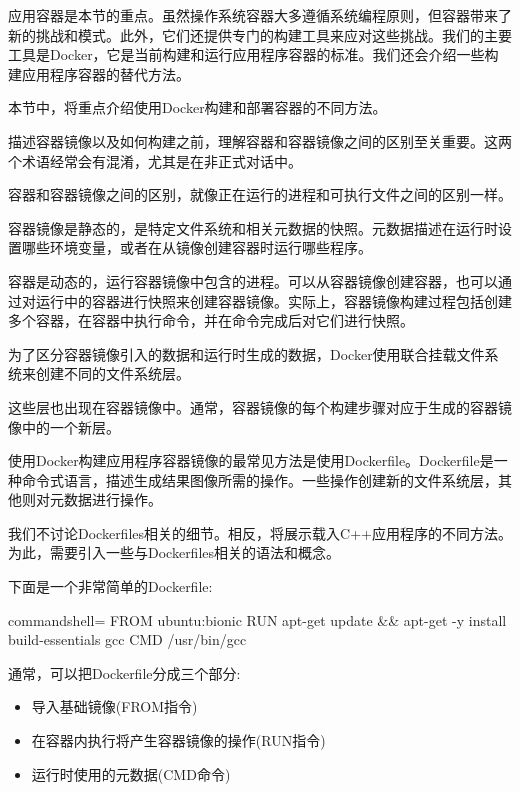 
应用容器是本节的重点。虽然操作系统容器大多遵循系统编程原则，但容器带来了新的挑战和模式。此外，它们还提供专门的构建工具来应对这些挑战。我们的主要工具是Docker，它是当前构建和运行应用程序容器的标准。我们还会介绍一些构建应用程序容器的替代方法。

本节中，将重点介绍使用Docker构建和部署容器的不同方法。


描述容器镜像以及如何构建之前，理解容器和容器镜像之间的区别至关重要。这两个术语经常会有混淆，尤其是在非正式对话中。

容器和容器镜像之间的区别，就像正在运行的进程和可执行文件之间的区别一样。

容器镜像是静态的，是特定文件系统和相关元数据的快照。元数据描述在运行时设置哪些环境变量，或者在从镜像创建容器时运行哪些程序。

容器是动态的，运行容器镜像中包含的进程。可以从容器镜像创建容器，也可以通过对运行中的容器进行快照来创建容器镜像。实际上，容器镜像构建过程包括创建多个容器，在容器中执行命令，并在命令完成后对它们进行快照。

为了区分容器镜像引入的数据和运行时生成的数据，Docker使用联合挂载文件系统来创建不同的文件系统层。

这些层也出现在容器镜像中。通常，容器镜像的每个构建步骤对应于生成的容器镜像中的一个新层。


使用Docker构建应用程序容器镜像的最常见方法是使用Dockerfile。Dockerfile是一种命令式语言，描述生成结果图像所需的操作。一些操作创建新的文件系统层，其他则对元数据进行操作。

我们不讨论Dockerfiles相关的细节。相反，将展示载入C++应用程序的不同方法。为此，需要引入一些与Dockerfiles相关的语法和概念。

下面是一个非常简单的Dockerfile:

\begin{tcblisting}{commandshell={}}
FROM ubuntu:bionic
RUN apt-get update && apt-get -y install build-essentials gcc
CMD /usr/bin/gcc
\end{tcblisting}

通常，可以把Dockerfile分成三个部分:

\begin{itemize}
\item 
导入基础镜像(FROM指令)

\item 
在容器内执行将产生容器镜像的操作(RUN指令)

\item 
运行时使用的元数据(CMD命令)
\end{itemize}

